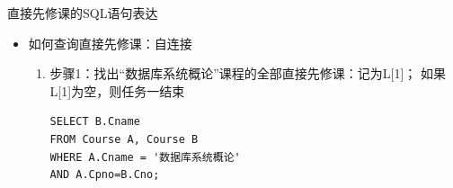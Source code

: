 \begin{frame}{直接先修课的SQL语句表达}
\begin{itemize}
    \item 如何查询直接先修课：自连接

\begin{enumerate}
    \item 步骤1：找出“数据库系统概论”课程的全部直接先修课：记为L[1]；
    如果L[1]为空，则任务一结束
\begin{block}{}
\begin{lstlisting}
SELECT B.Cname 
FROM Course A, Course B
WHERE A.Cname = '数据库系统概论' 
AND A.Cpno=B.Cno;
\end{lstlisting}
\end{block} 
\end{enumerate}
\end{itemize}
\end{frame}

